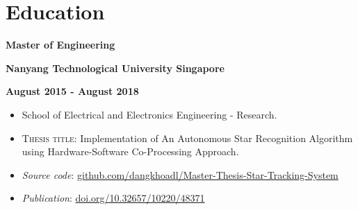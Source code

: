 \documentclass[10pt]{article}
\begin{document}
    \vspace{2mm}
    \section{Education}
        \vspace{-2mm}
        \begin{multicols}{3}
                \textbf{Master of Engineering}

            \columnbreak

                \textbf{Nanyang Technological University Singapore}

            \columnbreak

            \begin{flushright}
                \textbf{August 2015 - August 2018}
            \end{flushright}
        \end{multicols}

        \vspace{-5mm}
        \begin{itemize}[noitemsep]
            \item School of Electrical and Electronics Engineering - Research.
            \item \textsc{Thesis title}: Implementation of An Autonomous Star Recognition Algorithm using Hardware-Software Co-Processing Approach.
            \item \emph{Source code}: \href{https://github.com/dangkhoadl/Master-Thesis-Star-Tracking-System}{github.com/dangkhoadl/Master-Thesis-Star-Tracking-System}
            \item \emph{Publication}: \href{https://doi.org/10.32657/10220/48371}{doi.org/10.32657/10220/48371}
        \end{itemize}
        \vspace{-2mm}
\end{document}
